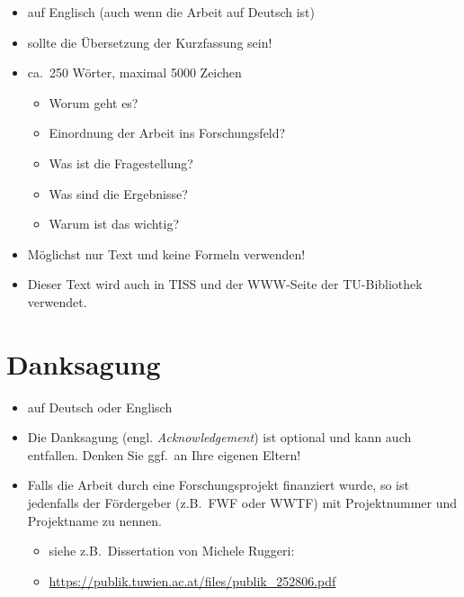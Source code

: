 {

  \begin{itemize}
    \item auf Englisch (auch wenn die Arbeit auf Deutsch ist)
    \item sollte die Übersetzung der Kurzfassung sein!
    \item ca.\ 250 Wörter, maximal 5000 Zeichen
          \begin{itemize}
            \item Worum geht es?
            \item Einordnung der Arbeit ins Forschungsfeld?
            \item Was ist die Fragestellung?
            \item Was sind die Ergebnisse?
            \item Warum ist das wichtig?
          \end{itemize}
    \item Möglichst nur Text und keine Formeln verwenden!
    \item Dieser Text wird auch in TISS und der WWW-Seite der TU-Bibliothek verwendet.
  \end{itemize}

}

\cleardoublepage


\chapter*{Danksagung} %
\thispagestyle{empty}

\begin{itemize}
  \item auf Deutsch oder Englisch
  \item Die Danksagung (engl. {\em Acknowledgement}) ist optional und kann auch entfallen. Denken Sie ggf.\ an Ihre eigenen Eltern!

  \item Falls die Arbeit durch eine Forschungsprojekt finanziert wurde, so ist jedenfalls der Fördergeber (z.B.\ FWF oder WWTF) mit Projektnummer und Projektname zu nennen.
        \begin{itemize}
          \item siehe z.B.\ Dissertation von Michele Ruggeri:
          \item[] \href{https://publik.tuwien.ac.at/files/publik_252806.pdf}{\ttfamily https://publik.tuwien.ac.at/files/publik\_252806.pdf}
        \end{itemize}

\end{itemize}

